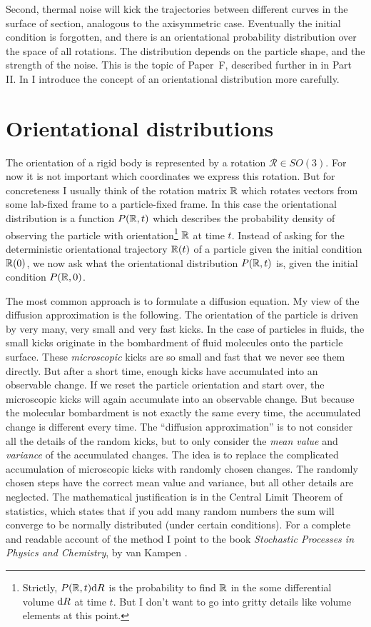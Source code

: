 \documentclass[thesis.tex]{subfiles}
\begin{document}
Second, thermal noise will kick the trajectories between different curves in the surface of section, analogous to the axisymmetric case. Eventually the initial condition is forgotten, and there is an orientational probability distribution over the space of all rotations. The distribution depends on the particle shape, and the strength of the noise. This is the topic of Paper~F, described further in  in Part II. In  I introduce the concept of an orientational distribution more carefully.

\clearpage
\section{Orientational distributions}

The orientation of a rigid body is represented by a rotation $\mathcal R\in SO(3)$. For now it is not important which coordinates we express this rotation. But for concreteness I usually think of the rotation matrix $\mathbb{R}$ which rotates vectors from some lab-fixed frame to a particle-fixed frame. In this case the orientational distribution is a function $P(\mathbb{R}, t)$ which describes the probability density of observing the particle with orientation\footnote{Strictly, $P(\mathbb{R}, t)\mathrm{d} R$ is the probability to find $\mathbb{R}$ in the some differential volume $\mathrm{d} R$ at time $t$. But I don't want to go into gritty details like volume elements at this point.} $\mathbb{R}$ at time $t$. Instead of asking for the deterministic orientational trajectory $\mathbb{R}(t)$ of a particle given the initial condition $\mathbb{R}(0)$, we now ask what the orientational distribution $P(\mathbb{R}, t)$ is, given the initial condition $P(\mathbb{R}, 0)$.

The most common approach is to formulate a diffusion equation. My view of the diffusion approximation is the following. The orientation of the particle is driven by very many, very small and very fast kicks. In the case of particles in fluids, the small kicks originate in the bombardment of fluid molecules onto the particle surface. These \emph{microscopic} kicks are so small and fast that we never see them directly. But after a short time, enough kicks have accumulated into an observable change. If we reset the particle orientation and start over, the microscopic kicks will again accumulate into an observable change. But because the molecular bombardment is not exactly the same every time, the accumulated change is different every time. The ``diffusion approximation'' is to not consider all the details of the random kicks, but to only consider the \emph{mean value} and \emph{variance} of the accumulated changes. The idea is to replace the complicated accumulation of microscopic kicks with randomly chosen changes. The randomly chosen steps have the correct mean value and variance, but all other details are neglected. The mathematical justification is in the Central Limit Theorem of statistics, which states that if you add many random numbers the sum will converge to be normally distributed (under certain conditions). For a complete and readable account of the method I point to the book \emph{Stochastic Processes in Physics and Chemistry}, by van Kampen \cite{kampen2007}.
\end{document}
